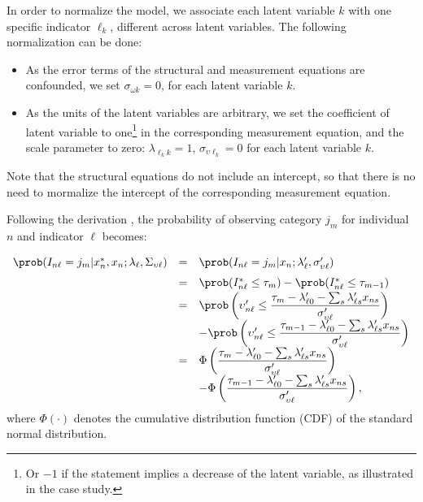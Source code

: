 \documentclass[12pt,a4paper]{article}
\begin{document}
In order to normalize the model, we associate each latent variable $k$ with one specific indicator $\ell_k$,  different across latent variables.
The following normalization can be done:
\begin{itemize}
\item As the error terms of the structural and measurement equations are confounded, we set $\sigma_{\omega k}=0$, for each latent variable $k$.
\item As the units of the latent variables are arbitrary, we set the coefficient of latent variable to one\footnote{Or $-1$ if the statement implies a decrease of the latent variable, as illustrated in the case study.}  in the corresponding measurement equation, and the scale parameter to zero: $\lambda_{\ell_k k}=1$, $\sigma_{\upsilon \ell_k}=0$ for each latent variable $k$.
\end{itemize}
Note that the structural equations do not include an intercept, so that there is no need to mormalize the intercept of the corresponding measurement equation. 

Following the derivation , the
probability of observing category $j_m$ for individual $n$ and indicator $\ell$ becomes:
\begin{equation}
\renewcommand{\arraystretch}{1.5}
\begin{array}{rcl}
\prob(I_{n\ell} = j_m| x^*_n, x_n ; \lambda_\ell, \Sigma_{\upsilon \ell}) &=&\prob(I_{n\ell} = j_m| x_n ; \lambda'_\ell, \sigma'_{\upsilon \ell}) \\&=& \prob(I^*_{n\ell} \leq \tau_m) - \prob(I^*_{n\ell} \leq \tau_{m-1}) \\
&=& \prob\left( \upsilon'_{n\ell} \leq \dfrac{\tau_m -\lambda'_{\ell 0} - \sum_s \lambda'_{\ell s} x_{ns}}{\sigma'_{\upsilon \ell}} \right) \\
& &- \prob\left( \upsilon'_{n\ell} \leq \dfrac{\tau_{m-1} -\lambda'_{\ell 0} - \sum_s \lambda'_{\ell s} x_{ns}}{\sigma'_{\upsilon \ell}} \right) \\
&=& \Phi\left(\dfrac{\tau_m -\lambda'_{\ell 0} - \sum_s \lambda'_{\ell s} x_{ns}}{\sigma'_{\upsilon \ell}} \right) \\
& &- \Phi\left( \dfrac{\tau_{m-1} -\lambda'_{\ell 0} - \sum_s \lambda'_{\ell s} x_{ns}}{\sigma'_{\upsilon \ell}} \right), \\
\end{array}
\end{equation}
where $\Phi(\cdot)$ denotes the cumulative distribution function (CDF) of the standard normal distribution.
\end{document}
